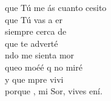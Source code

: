 \begin{cancion}%
	 que Tú me ás cuanto cesito \\
	 que Tú vas a er  \\
	siempre cerca de  \\
	 que te adverté \\
	ndo me sienta mor\\
	 queo moéé q no miré\\
	y que mpre vivi \\
	porque , mi Sor, vives ení.  \\
\end{cancion}%
